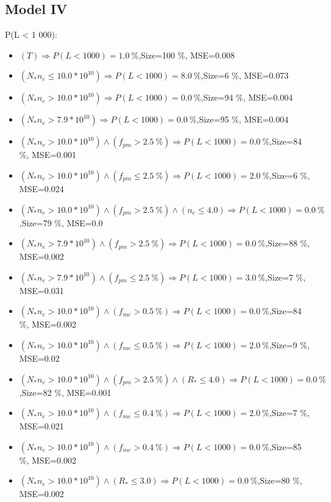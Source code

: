 \documentclass[numbered]{CSL}
\begin{document}
\subsection{Model IV}
P(L < 1 000):
\begin{itemize}
\item $(T) \Rightarrow P(L < 1 000) = 1.0~\%$,\hfill Size=100 \%, MSE=0.008
\item $(N_* n_e \leq 10.0 * 10^{10}) \Rightarrow P(L < 1 000) = 8.0~\%$,\hfill Size=6 \%, MSE=0.073
\item $(N_* n_e > 10.0 * 10^{10}) \Rightarrow P(L < 1 000) = 0.0~\%$,\hfill Size=94 \%, MSE=0.004
\item $(N_* n_e > 7.9 * 10^{10}) \Rightarrow P(L < 1 000) = 0.0~\%$,\hfill Size=95 \%, MSE=0.004
\item $(N_* n_e > 10.0 * 10^{10}) \land (f_{pm} > 2.5~\%) \Rightarrow P(L < 1 000) = 0.0~\%$,\hfill Size=84 \%, MSE=0.001
\item $(N_* n_e > 10.0 * 10^{10}) \land (f_{pm} \leq 2.5~\%) \Rightarrow P(L < 1 000) = 2.0~\%$,\hfill Size=6 \%, MSE=0.024
\item $(N_* n_e > 10.0 * 10^{10}) \land (f_{pm} > 2.5~\%) \land (n_e \leq 4.0) \Rightarrow P(L < 1 000) = 0.0~\%$,\hfill Size=79 \%, MSE=0.0
\item $(N_* n_e > 7.9 * 10^{10}) \land (f_{pm} > 2.5~\%) \Rightarrow P(L < 1 000) = 0.0~\%$,\hfill Size=88 \%, MSE=0.002
\item $(N_* n_e > 7.9 * 10^{10}) \land (f_{pm} \leq 2.5~\%) \Rightarrow P(L < 1 000) = 3.0~\%$,\hfill Size=7 \%, MSE=0.031
\item $(N_* n_e > 10.0 * 10^{10}) \land (f_{me} > 0.5~\%) \Rightarrow P(L < 1 000) = 0.0~\%$,\hfill Size=84 \%, MSE=0.002
\item $(N_* n_e > 10.0 * 10^{10}) \land (f_{me} \leq 0.5~\%) \Rightarrow P(L < 1 000) = 2.0~\%$,\hfill Size=9 \%, MSE=0.02
\item $(N_* n_e > 10.0 * 10^{10}) \land (f_{pm} > 2.5~\%) \land (R_* \leq 4.0) \Rightarrow P(L < 1 000) = 0.0~\%$,\hfill Size=82 \%, MSE=0.001
\item $(N_* n_e > 10.0 * 10^{10}) \land (f_{me} \leq 0.4~\%) \Rightarrow P(L < 1 000) = 2.0~\%$,\hfill Size=7 \%, MSE=0.021
\item $(N_* n_e > 10.0 * 10^{10}) \land (f_{me} > 0.4~\%) \Rightarrow P(L < 1 000) = 0.0~\%$,\hfill Size=85 \%, MSE=0.002
\item $(N_* n_e > 10.0 * 10^{10}) \land (R_* \leq 3.0) \Rightarrow P(L < 1 000) = 0.0~\%$,\hfill Size=80 \%, MSE=0.002

\end{itemize}
\end{document}
